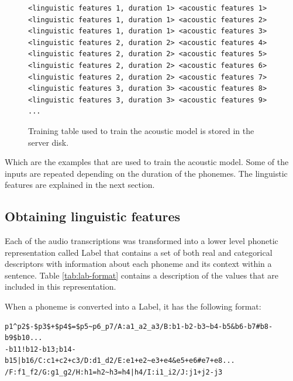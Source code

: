 \begin{figure}[h]
\begin{lstlisting}
<linguistic features 1, duration 1> <acoustic features 1>
<linguistic features 1, duration 1> <acoustic features 2>
<linguistic features 1, duration 1> <acoustic features 3>
<linguistic features 2, duration 2> <acoustic features 4>
<linguistic features 2, duration 2> <acoustic features 5>
<linguistic features 2, duration 2> <acoustic features 6>
<linguistic features 2, duration 2> <acoustic features 7>
<linguistic features 3, duration 3> <acoustic features 8>
<linguistic features 3, duration 3> <acoustic features 9>
...
\end{lstlisting}
\caption{Training table used to train the acoustic model is stored in the server disk.}
\end{figure}

Which are the examples that are used to train the acoustic model. Some of the inputs are repeated depending on the duration of the phonemes. The linguistic features are explained in the next section. 

\subsection{Obtaining linguistic features} \label{sec:ling-feat}

Each of the audio transcriptions was transformed into a lower level phonetic representation called Label that contains a set of both real and categorical descriptors with information about each phoneme and its context within a sentence. Table \ref{tab:lab-format} contains a description of the values that are included in this representation.

When a phoneme is converted into a Label, it has the following format:

\begin{lstlisting}
p1^p2$-$p3$+$p4$=$p5~p6_p7/A:a1_a2_a3/B:b1-b2-b3~b4-b5&b6-b7#b8-b9$b10...
-b11!b12-b13;b14-b15|b16/C:c1+c2+c3/D:d1_d2/E:e1+e2~e3+e4&e5+e6#e7+e8...
/F:f1_f2/G:g1_g2/H:h1=h2~h3=h4|h4/I:i1_i2/J:j1+j2-j3
\end{lstlisting}

